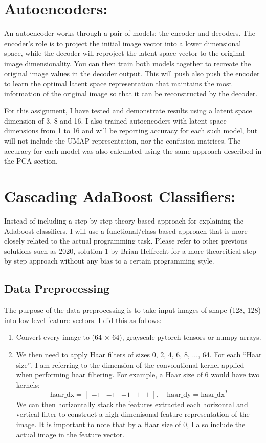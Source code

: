 \documentclass{article}
\begin{document}
\section{Autoencoders:}
An autoencoder works through a pair of models: the encoder and decoders. The encoder's role is to project the initial image vector into a lower dimensional space, while the decoder will reproject the latent space vector to the original image dimensionality. You can then train both models together to recreate the original image values in the decoder output. This will push also push the encoder to learn the optimal latent space representation that maintains the most information of the original image so that it can be reconstructed by the decoder.

For this assignment, I have tested and demonstrate results using a latent space dimension of 3, 8 and 16. I also trained autoencoders with latent space dimensions from 1 to 16 and will be reporting accuracy for each such model, but will not include the UMAP representation, nor the confusion matrices. The accuracy for each model was also calculated using the same approach described in the PCA section.

\section{Cascading AdaBoost Classifiers:}
Instead of including a step by step theory based approach for explaining the Adaboost classifiers, I will use a functional/class based approach that is more closely related to the actual programming task. Please refer to other previous solutions such as 2020, solution 1 by Brian Helfrecht for a more theoreitical step by step approach without any bias to a certain programming style.

\subsection{Data Preprocessing}
The purpose of the data preprocessing is to take input images of shape (128, 128) into low level feature vectors. I did this as follows:
\begin{enumerate}
    \item Convert every image to (64 $\times$ 64), grayscale pytorch tensors or numpy arrays.
    \item We then need to apply Haar filters of sizes 0, 2, 4, 6, 8, ..., 64. For each ``Haar size'', I am referring to the dimension of the convolutional kernel applied when performing haar filtering. For example, a Haar size of 6 would have two kernels:
    \[ \text{haar\_dx} = \begin{bmatrix} 
        -1 & -1 & -1 & 1 & 1 
    \end{bmatrix}, \quad \text{haar\_dy} = \text{haar\_dx}^T\]
    We can then horizontally stack the features extracted each horizontal and vertical filter to construct a high dimenisonal feature representation of the image. It is important to note that by a Haar size of 0, I also include the actual image in the feature vector.
\end{enumerate}
\end{document}
